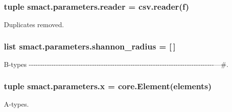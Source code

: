 \subsubsection[{reader}]{\setlength{\rightskip}{0pt plus 5cm}tuple smact.\+parameters.\+reader = csv.\+reader(f)}\label{namespacesmact_1_1parameters_a3fdea3c0c08ebe498efc38f3c3cacb96}


Duplicates removed. 

\hypertarget{namespacesmact_1_1parameters_ac0c38ccc1997b7b2994407fd74c58e5a}{}
\subsubsection[{shannon\+\_\+radius}]{\setlength{\rightskip}{0pt plus 5cm}list smact.\+parameters.\+shannon\+\_\+radius = \mbox{[}$\,$\mbox{]}}\label{namespacesmact_1_1parameters_ac0c38ccc1997b7b2994407fd74c58e5a}


B-\/types -\/-\/-\/-\/-\/-\/-\/-\/-\/-\/-\/-\/-\/-\/-\/-\/-\/-\/-\/-\/-\/-\/-\/-\/-\/-\/-\/-\/-\/-\/-\/-\/-\/-\/-\/-\/-\/-\/-\/-\/-\/-\/-\/-\/-\/-\/-\/-\/-\/-\/-\/-\/-\/-\/-\/-\/-\/-\/-\/-\/-\/-\/-\/-\/-\/-\/-\/-\/-\/-\/-\/-\/-\/-\/-\/-\/-\/-\/-\/-\/-\/-\/---\#. 

\hypertarget{namespacesmact_1_1parameters_a7ffa704a6ef8436803e18fcef5d9f65c}{}
\subsubsection[{x}]{\setlength{\rightskip}{0pt plus 5cm}tuple smact.\+parameters.\+x = {\bf core.\+Element}(elements)}\label{namespacesmact_1_1parameters_a7ffa704a6ef8436803e18fcef5d9f65c}


A-\/types. 

